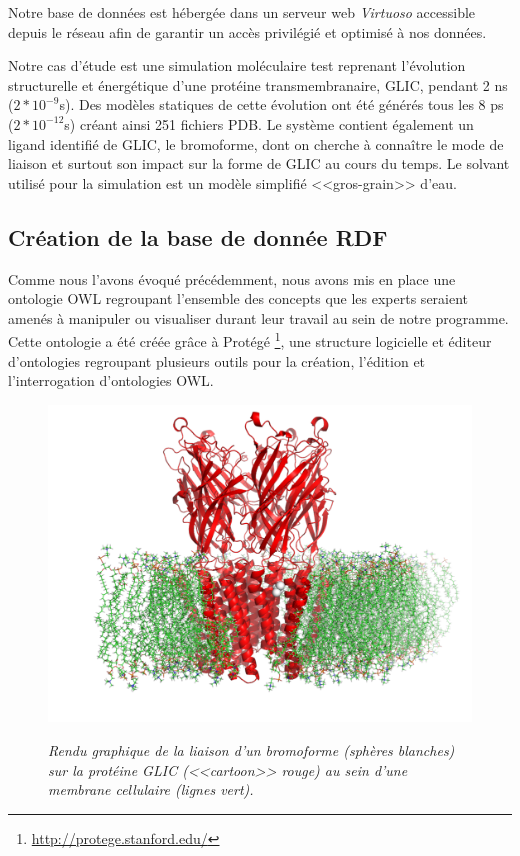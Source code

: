 Notre base de données est hébergée dans un serveur web \textit{Virtuoso} accessible depuis le réseau afin de garantir un accès privilégié et optimisé à nos données. 

Notre cas d'étude est une simulation moléculaire test reprenant l'évolution structurelle et énergétique d'une protéine transmembranaire, GLIC, pendant 2 ns ($2*10^{-9}$s). Des modèles statiques de cette évolution ont été générés tous les 8 ps ($2*10^{-12}$s) créant ainsi 251 fichiers PDB. Le système contient également un ligand identifié de GLIC, le bromoforme, dont on cherche à connaître le mode de liaison et surtout son impact sur la forme de GLIC au cours du temps. Le solvant utilisé pour la simulation est un modèle simplifié <<gros-grain>> d'eau.

\subsection{Création de la base de donnée RDF}

Comme nous l'avons évoqué précédemment, nous avons mis en place une ontologie OWL regroupant l'ensemble des concepts que les experts seraient amenés à manipuler ou visualiser durant leur travail au sein de notre programme. Cette ontologie a été créée grâce à Protégé \footnote{\url{http://protege.stanford.edu/}}, une structure logicielle et éditeur d'ontologies regroupant plusieurs outils pour la création, l'édition et l'interrogation d'ontologies OWL.

\begin{figure}
  \centering
  {\includegraphics[width=.75\linewidth]{./figures/ch5/glic+bromoform.pdf}}
    \caption[Rendu graphique de GLIC et son ligand.]{{\it Rendu graphique de la liaison d'un bromoforme (sphères blanches) sur la protéine GLIC (<<cartoon>> rouge) au sein d'une membrane cellulaire (lignes vert).}}
  \label{Fig:glic+bromoform}
  \hspace{0.3cm}
\end{figure}

